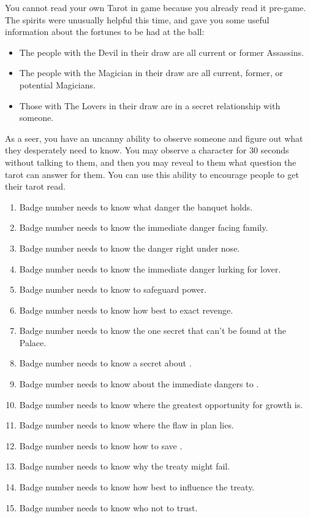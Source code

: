 \documentclass[green]{NeptuneBall}
\begin{document}
You cannot read your own Tarot in game because you already read it pre-game. The spirits were unusually helpful this time, and gave you some useful information about the fortunes to be had at the ball:

\begin{itemize}
\item The people with the Devil in their draw are all current or former Assassins.
\item The people with the Magician in their draw are all current, former, or potential Magicians.
\item Those with The Lovers in their draw are in a secret relationship with someone.
\end{itemize}

\newpage
As a seer, you have an uncanny ability to observe someone and figure out what they desperately need to know.  You may observe a character for 30 seconds without talking to them, and then you may reveal to them what question the tarot can answer for them. You can use this ability to encourage people to get their tarot read.

\begin{enumerate}
	\item Badge number \cPlant{\MYnumber} needs to know what danger the banquet holds.
	\item Badge number \cKing{\MYnumber} needs to know the immediate danger facing \cKing{\their} family.
	\item Badge number \cQueen{\MYnumber} needs to know the danger right under \cQueen{\their} nose.
	\item Badge number \cGeneral{\MYnumber} needs to know the immediate danger lurking for \cGeneral{\their} lover.
	\item Badge number \cWitch{\MYnumber} needs to know to safeguard \cWitch{\their} power.
	\item Badge number \cPriest{\MYnumber} needs to know how best to exact revenge.
	\item Badge number \cReporter{\MYnumber} needs to know the one secret that can't be found at the Palace.
	\item Badge number \cPrincess{\MYnumber} needs to know a secret about \cPrincess{\their} \cAthena{\parent}.
	\item Badge number \cAriel{\MYnumber} needs to know about the immediate dangers to \pAtlantis{}.
	\item Badge number \cWillow{\MYnumber} needs to know where the greatest opportunity for growth is.
	\item Badge number \cManta{\MYnumber} needs to know where the flaw in \cManta{\their} plan lies.
	\item Badge number \cBodyguard{\MYnumber} needs to know how to save \pPacifica{}.
	\item Badge number \cPrince{\MYnumber} needs to know why the treaty might fail.
	\item Badge number \cSpy{\MYnumber} needs to know how best to influence the treaty.
	\item Badge number \cDiplomat{\MYnumber} needs to know who not to trust.
\end{enumerate}
\end{document}

